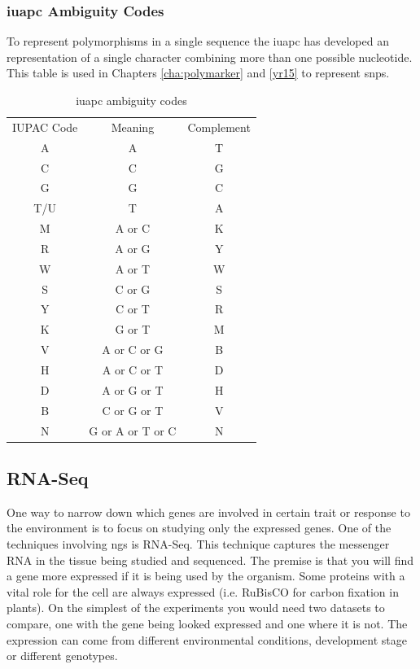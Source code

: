 \subsubsection{\gls{iuapc} Ambiguity Codes}
\label{lit:ambiguity}
To represent polymorphisms in a single sequence the \gls{iuapc} has developed an representation of a single character combining more than one possible nucleotide. 
This table is used in Chapters \ref{cha:polymarker} and \ref{yr15} to represent \glspl{snp}.

\begin{table}
\caption{\gls{iuapc} ambiguity codes}
\centering
\begin{tabular}{ccc}
\toprule
IUPAC Code & Meaning & Complement \\
A & A & T \\
C & C & G \\
G & G & C \\
T/U & T & A \\
M & A or C & K \\
R & A or G & Y \\
W & A or T & W \\
S & C or G & S \\
Y & C or T & R \\
K & G or T & M \\
V & A or C or G & B \\
H & A or C or T & D \\
D & A or G or T & H \\
B & C or G or T & V \\
N & G or A or T or C & N \\
\bottomrule
\end{tabular}
\end{table}

\subsection{RNA-Seq}
\label{lit:RNASeq}

One way to narrow down which genes are involved in certain trait or response to the environment is to focus on studying only the expressed genes. One of the techniques involving \gls{ngs} is RNA-Seq. This technique captures the messenger RNA in the tissue being studied and sequenced. The premise is that you will find a gene more expressed if it is being used by the organism. Some proteins with a vital role for the cell are always expressed (i.e. RuBisCO for carbon fixation in plants\cite{CooperGM2000}). On the simplest of the experiments you would need two datasets to compare, one with the gene being looked expressed and one where it is not. The expression can come from different environmental conditions, development stage or different genotypes.\cite{Mortazavi2008} 

